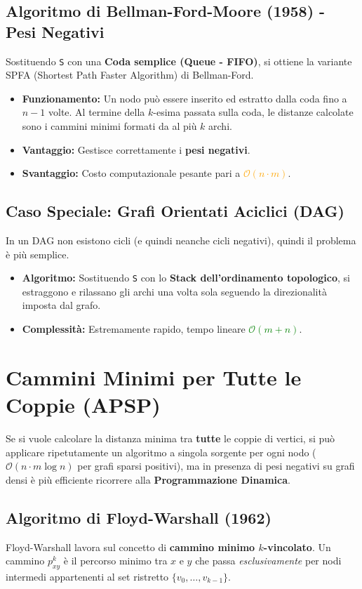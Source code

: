 \documentclass[12pt, a4paper]{article}
\begin{document}
\subsection{Algoritmo di Bellman-Ford-Moore (1958) - Pesi Negativi}
Sostituendo \texttt{S} con una \textbf{Coda semplice (Queue - FIFO)}, si ottiene la variante SPFA (Shortest Path Faster Algorithm) di Bellman-Ford.
\begin{itemize}
\item \textbf{Funzionamento:} Un nodo può essere inserito ed estratto dalla coda fino a $n-1$ volte. Al termine della $k$-esima passata sulla coda, le distanze calcolate sono i cammini minimi formati da al più $k$ archi.
\item \textbf{Vantaggio:} Gestisce correttamente i \textbf{pesi negativi}.
\item \textbf{Svantaggio:} Costo computazionale pesante pari a \textcolor{orange}{$\mathcal{O}(n \cdot m)$}.
\end{itemize}

\subsection{Caso Speciale: Grafi Orientati Aciclici (DAG)}
In un DAG non esistono cicli (e quindi neanche cicli negativi), quindi il problema è più semplice.
\begin{itemize}
\item \textbf{Algoritmo:} Sostituendo \texttt{S} con lo \textbf{Stack dell'ordinamento topologico}, si estraggono e rilassano gli archi una volta sola seguendo la direzionalità imposta dal grafo.
\item \textbf{Complessità:} Estremamente rapido, tempo lineare \textcolor{green}{$\mathcal{O}(m + n)$}.
\end{itemize}

\newpage

\section{Cammini Minimi per Tutte le Coppie (APSP)}

Se si vuole calcolare la distanza minima tra \textbf{tutte} le coppie di vertici, si può applicare ripetutamente un algoritmo a singola sorgente per ogni nodo ($\mathcal{O}(n \cdot m \log n)$ per grafi sparsi positivi), ma in presenza di pesi negativi su grafi densi è più efficiente ricorrere alla \textbf{Programmazione Dinamica}.

\subsection{Algoritmo di Floyd-Warshall (1962)}
Floyd-Warshall lavora sul concetto di \textbf{cammino minimo $k$-vincolato}.
Un cammino $p_{xy}^k$ è il percorso minimo tra $x$ e $y$ che passa \textit{esclusivamente} per nodi intermedi appartenenti al set ristretto $\{v_0, \dots, v_{k-1}\}$.
\end{document}
